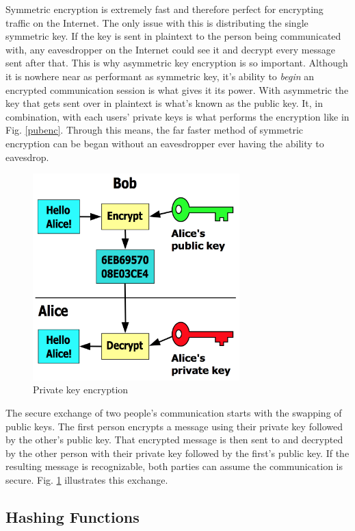 \documentclass[journal]{IEEEtran}
\begin{document}
Symmetric encryption is extremely fast and therefore perfect for encrypting traffic on the Internet.  The only issue with this is distributing the single symmetric key.  If the key is sent in plaintext to the person being communicated with, any eavesdropper on the Internet could see it and decrypt every message sent after that.  This is why asymmetric key encryption is so important.  Although it is nowhere near as performant as symmetric key, it's ability to \emph{begin} an encrypted communication session is what gives it its power.  With asymmetric the key that gets sent over in plaintext is what's known as the public key.  It, in combination, with each users' private keys is what performs the encryption like in Fig. \ref{pubenc}.  Through this means, the far faster method of symmetric encryption can be began without an eavesdropper ever having the ability to eavesdrop.

\begin{figure}[htbp]
	\centering
	\includegraphics[width=8cm,keepaspectratio]{img/crypto2.png}
	\caption{Private key encryption \cite{KeyFigure} }
	\label{keytypes}
\end{figure}

The secure exchange of two people's communication starts with the swapping of public keys.  The first person encrypts a message using their private key followed by the other's public key.  That encrypted message is then sent to and decrypted by the other person with their private key followed by the first's public key.  If the resulting message is recognizable, both parties can assume the communication is secure.  Fig. \ref{keytypes} illustrates this exchange.


\subsection{Hashing Functions}
\end{document}
